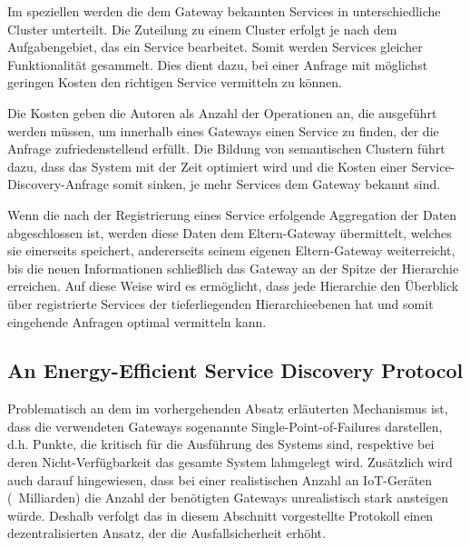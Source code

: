 \documentclass[conference,compsoc]{IEEEtran}
\begin{document}
Im speziellen werden die dem Gateway bekannten Services in unterschiedliche Cluster unterteilt. Die Zuteilung zu einem Cluster erfolgt je nach dem Aufgabengebiet, das ein Service bearbeitet. Somit werden Services gleicher Funktionalität gesammelt. Dies dient dazu, bei einer Anfrage mit möglichst geringen Kosten den richtigen Service vermitteln zu können. 

Die Kosten geben die Autoren als Anzahl der Operationen an, die ausgeführt werden müssen, um innerhalb eines Gateways einen Service zu finden, der die Anfrage zufriedenstellend erfüllt. Die Bildung von semantischen Clustern führt dazu, dass das System mit der Zeit optimiert wird und die Kosten einer Service-Discovery-Anfrage somit sinken, je mehr Services dem Gateway bekannt sind.

Wenn die nach der Registrierung eines Service erfolgende Aggregation der Daten abgeschlossen ist, werden diese Daten dem Eltern-Gateway übermittelt, welches sie einerseits speichert, andererseits seinem eigenen Eltern-Gateway weiterreicht, bis die neuen Informationen schließlich das Gateway an der Spitze der Hierarchie erreichen. Auf diese Weise wird es ermöglicht, dass jede Hierarchie den Überblick über registrierte Services der tieferliegenden Hierarchieebenen hat und somit eingehende Anfragen optimal vermitteln kann.

\subsection{An Energy-Efficient Service Discovery Protocol}

Problematisch an dem im vorhergehenden Absatz erläuterten Mechanismus ist, dass die verwendeten Gateways sogenannte Single-Point-of-Failures darstellen, d.h. Punkte, die kritisch für die Ausführung des Systems sind, respektive bei deren Nicht-Verfügbarkeit das gesamte System lahmgelegt wird. Zusätzlich wird auch darauf hingewiesen, dass bei einer realistischen Anzahl an IoT-Geräten (~Milliarden) die Anzahl der benötigten Gateways unrealistisch stark ansteigen würde. Deshalb verfolgt das in diesem Abschnitt vorgestellte Protokoll einen dezentralisierten Ansatz, der die Ausfallsicherheit erhöht.
\end{document}
